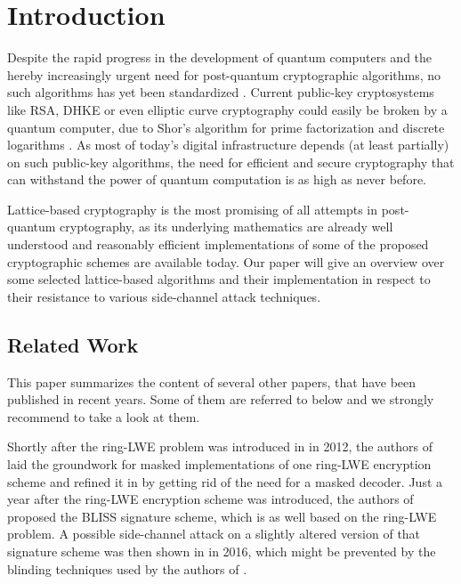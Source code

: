 %
%

\chapter{Introduction}
Despite the rapid progress in the development of quantum computers and the hereby increasingly urgent need for post-quantum cryptographic algorithms, no such algorithms has yet been standardized \cite{Nist}. Current public-key cryptosystems like RSA, DHKE or even elliptic curve cryptography could easily be broken by a quantum computer, due to Shor's algorithm for prime factorization and discrete logarithms \cite{Shor}. As most of today's digital infrastructure depends (at least partially) on such public-key algorithms, the need for efficient and secure cryptography that can withstand the power of quantum computation is as high as never before.

Lattice-based cryptography is the most promising of all attempts in post-quantum cryptography, as its underlying mathematics are already well understood and reasonably efficient implementations of some of the proposed cryptographic schemes are available today. Our paper will give an overview over some selected lattice-based algorithms and their implementation in respect to their resistance to various side-channel attack techniques.

\section{Related Work}
This paper summarizes the content of several other papers, that have been published in recent years. Some of them are referred to below and we strongly recommend to take a look at them.

Shortly after the \acs{ring-LWE} problem was introduced in \cite{cryptoeprint:2012:230} in 2012, the authors of \cite{maskedRing} laid the groundwork for masked implementations of one \acs{ring-LWE} encryption scheme and refined it in \cite{Reparaz2016} by getting rid of the need for a masked decoder. Just a year after the \acs{ring-LWE} encryption scheme was introduced, the authors of \cite{bliss} proposed the BLISS signature scheme, which is as well based on the \acs{ring-LWE} problem. A possible side-channel attack on a slightly altered version of that signature scheme was then shown in \cite{cryptoeprint:2016:300} in 2016, which might be prevented by the blinding techniques used by the authors of \cite{cryptoeprint:2016:276}.

